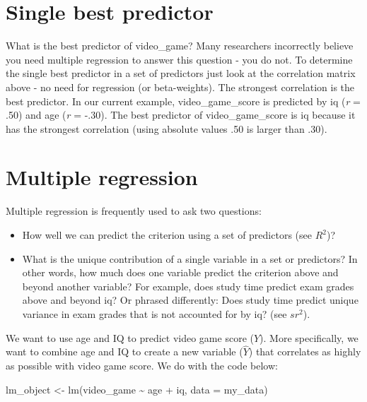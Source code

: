 \documentclass[
]{krantz}
\makeatletter
\newenvironment{Shaded}{\begin{snugshade}}{\end{snugshade}}
\newcommand{\AttributeTok}[1]{\textcolor[rgb]{0.61,0.61,0.61}{#1}}
\newcommand{\FunctionTok}[1]{\textcolor[rgb]{0,0,0}{#1}}
\newcommand{\NormalTok}[1]{#1}
\newcommand{\OtherTok}[1]{\textcolor[rgb]{0.37,0.37,0.37}{#1}}
\newcommand{\SpecialCharTok}[1]{\textcolor[rgb]{0,0,0}{#1}}
\newenvironment{kframe}{%
\medskip{}
\setlength{\fboxsep}{.8em}
 \def\at@end@of@kframe{}%
 \ifinner\ifhmode%
  \def\at@end@of@kframe{\end{minipage}}%
  \begin{minipage}{\columnwidth}%
 \fi\fi%
 \def\FrameCommand##1{\hskip\@totalleftmargin \hskip-\fboxsep
 \colorbox{shadecolor}{##1}\hskip-\fboxsep
     \hskip-\linewidth \hskip-\@totalleftmargin \hskip\columnwidth}%
 \MakeFramed {\advance\hsize-\width
   \@totalleftmargin\z@ \linewidth\hsize
   \@setminipage}}%
 {\par\unskip\endMakeFramed%
 \at@end@of@kframe}
\renewenvironment{Shaded}{\begin{kframe}}{\end{kframe}}
\makeatother
\begin{document}
\hypertarget{single-best-predictor}{%
\section{Single best predictor}\label{single-best-predictor}}

What is the best predictor of video\_game? Many researchers incorrectly believe you need multiple regression to answer this question - you do not. To determine the single best predictor in a set of predictors just look at the correlation matrix above - no need for regression (or beta-weights). The strongest correlation is the best predictor. In our current example, video\_game\_score is predicted by iq (\emph{r} = .50) and age (\emph{r} = -.30). The best predictor of video\_game\_score is iq because it has the strongest correlation (using absolute values .50 is larger than .30).

\hypertarget{multiple-regression-1}{%
\section{Multiple regression}\label{multiple-regression-1}}

Multiple regression is frequently used to ask two questions:

\begin{itemize}
\item
  How well we can predict the criterion using a set of predictors (see \(R^2\))?
\item
  What is the unique contribution of a single variable in a set or predictors? In other words, how much does one variable predict the criterion above and beyond another variable? For example, does study time predict exam grades above and beyond iq? Or phrased differently: Does study time predict unique variance in exam grades that is not accounted for by iq? (see \(sr^2\)).
\end{itemize}

We want to use age and IQ to predict video game score (\(Y\)). More specifically, we want to combine age and IQ to create a new variable (\(\widehat{Y}\)) that correlates as highly as possible with video game score. We do with the code below:

\begin{Shaded}
\begin{Highlighting}[]
\NormalTok{lm\_object }\OtherTok{\textless{}{-}} \FunctionTok{lm}\NormalTok{(video\_game }\SpecialCharTok{\textasciitilde{}}\NormalTok{ age }\SpecialCharTok{+}\NormalTok{ iq,}
                    \AttributeTok{data =}\NormalTok{ my\_data)}
\end{Highlighting}
\end{Shaded}
\end{document}
